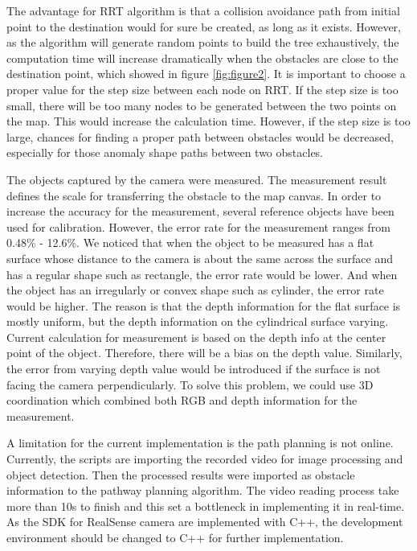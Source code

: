 \documentclass[
  oneside]{ubcthesis}
\begin{document}
The advantage for RRT algorithm is that a collision avoidance path from initial point to the destination would for sure be created, as long as it exists. However, as the algorithm will generate random points to build the tree exhaustively, the computation time will increase dramatically when the obstacles are close to the destination point, which showed in figure \ref{fig:figure2}. It is important to choose a proper value for the step size between each node on RRT. If the step size is too small, there will be too many nodes to be generated between the two points on the map. This would increase the calculation time. However, if the step size is too large, chances for finding a proper path between obstacles would be decreased, especially for those anomaly shape paths between two obstacles.

The objects captured by the camera were measured. The measurement result defines the scale for transferring the obstacle to the map canvas. In order to increase the accuracy for the measurement, several reference objects have been used for calibration. However, the error rate for the measurement ranges from 0.48\% - 12.6\%. We noticed that when the object to be measured has a flat surface whose distance to the camera is about the same across the surface and has a regular shape such as rectangle, the error rate would be lower. And when the object has an irregularly or convex shape such as cylinder, the error rate would be higher. The reason is that the depth information for the flat surface is mostly uniform, but the depth information on the cylindrical surface varying. Current calculation for measurement is based on the depth info at the center point of the object. Therefore, there will be a bias on the depth value. Similarly, the error from varying depth value would be introduced if the surface is not facing the camera perpendicularly. To solve this problem, we could use 3D coordination which combined both RGB and depth information for the measurement.

A limitation for the current implementation is the path planning is not online. Currently, the scripts are importing the recorded video for image processing and object detection. Then the processed results were imported as obstacle information to the pathway planning algorithm. The video reading process take more than 10s to finish and this set a bottleneck in implementing it in real-time. As the SDK for RealSense camera are implemented with C++, the development environment should be changed to C++ for further implementation.
\end{document}
